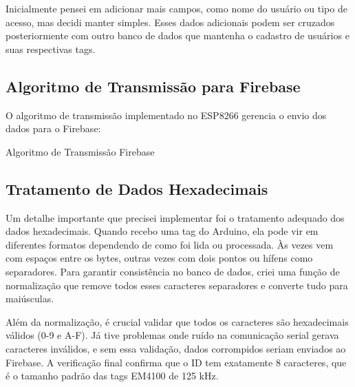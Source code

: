 Inicialmente pensei em adicionar mais campos, como nome do usuário ou tipo de acesso, mas decidi manter simples. Esses dados adicionais podem ser cruzados posteriormente com outro banco de dados que mantenha o cadastro de usuários e suas respectivas tags.

\subsection{Algoritmo de Transmissão para Firebase}

O algoritmo de transmissão implementado no ESP8266 gerencia o envio dos dados para o Firebase:

\begin{algorithm}[H]
\caption{Algoritmo de Transmissão Firebase}
\label{algo:transmissao-firebase}
\end{algorithm}

\subsection{Tratamento de Dados Hexadecimais}

Um detalhe importante que precisei implementar foi o tratamento adequado dos dados hexadecimais. Quando recebo uma tag do Arduino, ela pode vir em diferentes formatos dependendo de como foi lida ou processada. Às vezes vem com espaços entre os bytes, outras vezes com dois pontos ou hífens como separadores. Para garantir consistência no banco de dados, criei uma função de normalização que remove todos esses caracteres separadores e converte tudo para maiúsculas.

Além da normalização, é crucial validar que todos os caracteres são hexadecimais válidos (0-9 e A-F). Já tive problemas onde ruído na comunicação serial gerava caracteres inválidos, e sem essa validação, dados corrompidos seriam enviados ao Firebase. A verificação final confirma que o ID tem exatamente 8 caracteres, que é o tamanho padrão das tags EM4100 de 125 kHz.

